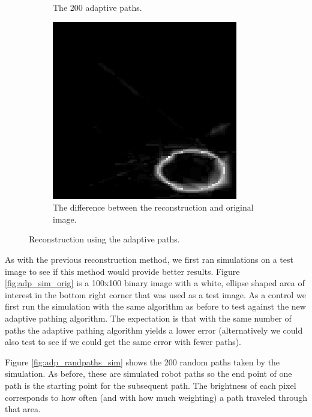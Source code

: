 \documentclass[english]{article}\usepackage[]{graphicx}\usepackage[]{color}
\begin{document}
\begin{figure}
\begin{subfigure}{.22\textwidth}
  \caption{The 200 adaptive paths.}
  \vspace{0pt}
  \label{fig:adp_adpaths}
\end{subfigure}%
\hspace {10pt}
\begin{subfigure}{.22\textwidth}
  \centering
    \includegraphics[width=1\linewidth]{figures/adaptiveresulterror}
  \caption{The difference between the reconstruction and original image.}
  \vspace{0pt}
  \label{fig:adp_adpaths_sim_diff}
\end{subfigure}
\caption{Reconstruction using the adaptive paths.}
\label{fig:adp_adpaths_sim_fig}

\end{figure}
As with the previous reconstruction method, we first ran simulations on a test image to see if this method would provide better results. Figure \ref{fig:adp_sim_orig} is a 100x100 binary image with a white, ellipse shaped area of interest in the bottom right corner that was used as a test image. As a control we first run the simulation with the same algorithm as before to test against the new adaptive pathing algorithm. The expectation is that with the same number of paths the adaptive pathing algorithm yields a lower error (alternatively we could also test to see if we could get the same error with fewer paths).  

Figure \ref{fig:adp_randpaths_sim} shows the 200 random paths taken by the simulation. As before, these are simulated robot paths so the end point of one path is the starting point for the subsequent path. The brightness of each pixel corresponds to how often (and with how much weighting) a path traveled through that area. 
\end{document}

